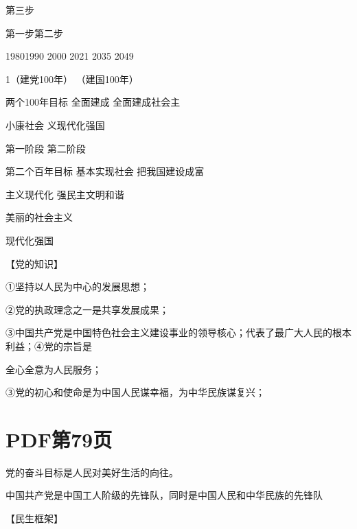 \documentclass[lang=cn,11pt]{elegantbook}
\newcommand{\daofasym}[1]{{\daofasymbolfont #1}}
\newcommand{\daofasym}[1]{#1}
\begin{document}
第三步\par

第一步第二步\par

19801990 2000 2021 2035 2049\par

1（建党100年） （建国100年）\par

两个100年目标 全面建成 全面建成社会主\par

小康社会 义现代化强国\par

第一阶段 第二阶段\par

第二个百年目标 基本实现社会 把我国建设成富\par

主义现代化 强民主文明和谐\par

美丽的社会主义\par

现代化强国\par

【党的知识】\par

\daofasym{①}坚持以人民为中心的发展思想；\par

\daofasym{②}党的执政理念之一是共享发展成果；\par

\daofasym{③}中国共产党是中国特色社会主义建设事业的领导核心；代表了最广大人民的根本利益；\daofasym{④}党的宗旨是\par

全心全意为人民服务；\par

\daofasym{③}党的初心和使命是为中国人民谋幸福，为中华民族谋复兴；\par


\section*{PDF第79页}

党的奋斗目标是人民对美好生活的向往。\par

中国共产党是中国工人阶级的先锋队，同时是中国人民和中华民族的先锋队\par

【民生框架】\par
\end{document}
